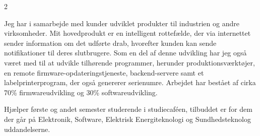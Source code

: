 \documentclass[10pt,a4paper,normalphoto]{altacv}
\begin{document}
\begin{paracol}{2}


Jeg har i samarbejde med kunder udviklet produkter til industrien og andre virksomheder. Mit hovedprodukt er en intelligent rottefælde, der via internettet sender information om det udførte drab, hvorefter kunden kan sende notifikationer til deres slutbrugere. Som en del af denne udvikling har jeg også været med til at udvikle tilhørende programmer, herunder produktionsværktøjer, en remote firmware-opdateringstjeneste, backend-servere samt et labelprinterprogram, der også genererer serienumre. Arbejdet har bestået af cirka 70\% firmwareudvikling og 30\% softwareudvikling.

\divider


Hjælper første og andet semester studerende i studiecaféen, tilbuddet er for dem der går på Elektronik, Software, Elektrisk Energiteknologi og Sundhedsteknolog uddandelserne.

\divider



\divider



\switchcolumn








\end{paracol}
\end{document}

